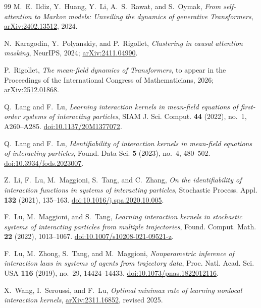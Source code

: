 \documentclass[11pt]{amsart}
\numberwithin{equation}{section}
\theoremstyle{plain}
\begin{document}
\begin{thebibliography}{99}
M.~E.~Ildiz, Y.~Huang, Y.~Li, A.~S.~Rawat, and S.~Oymak,
\emph{From self-attention to Markov models: Unveiling the dynamics of
generative Transformers},
\href{https://arxiv.org/abs/2402.13512}{arXiv:2402.13512}, 2024.

N.~Karagodin, Y.~Polyanskiy, and P.~Rigollet,
\emph{Clustering in causal attention masking},
NeurIPS, 2024;
\href{https://arxiv.org/abs/2411.04990}{arXiv:2411.04990}.

P.~Rigollet,
\emph{The mean-field dynamics of Transformers},
to appear in the Proceedings of the International Congress of Mathematicians,
2026;
\href{https://arxiv.org/abs/2512.01868}{arXiv:2512.01868}.

Q.~Lang and F.~Lu,
\emph{Learning interaction kernels in mean-field equations of first-order
systems of interacting particles},
SIAM J. Sci. Comput. \textbf{44} (2022), no.~1, A260--A285.
\href{https://doi.org/10.1137/20M1377072}{doi:10.1137/20M1377072}.

Q.~Lang and F.~Lu,
\emph{Identifiability of interaction kernels in mean-field equations of
interacting particles},
Found. Data Sci. \textbf{5} (2023), no.~4, 480--502.
\href{https://doi.org/10.3934/fods.2023007}{doi:10.3934/fods.2023007}.

Z.~Li, F.~Lu, M.~Maggioni, S.~Tang, and C.~Zhang,
\emph{On the identifiability of interaction functions in systems of
interacting particles},
Stochastic Process. Appl. \textbf{132} (2021), 135--163.
\href{https://doi.org/10.1016/j.spa.2020.10.005}
{doi:10.1016/j.spa.2020.10.005}.

F.~Lu, M.~Maggioni, and S.~Tang,
\emph{Learning interaction kernels in stochastic systems of interacting
particles from multiple trajectories},
Found. Comput. Math. \textbf{22} (2022), 1013--1067.
\href{https://doi.org/10.1007/s10208-021-09521-z}
{doi:10.1007/s10208-021-09521-z}.

F.~Lu, M.~Zhong, S.~Tang, and M.~Maggioni,
\emph{Nonparametric inference of interaction laws in systems of agents from
trajectory data},
Proc. Natl. Acad. Sci. USA \textbf{116} (2019), no.~29, 14424--14433.
\href{https://doi.org/10.1073/pnas.1822012116}
{doi:10.1073/pnas.1822012116}.

X.~Wang, I.~Seroussi, and F.~Lu,
\emph{Optimal minimax rate of learning nonlocal interaction kernels},
\href{https://arxiv.org/abs/2311.16852}{arXiv:2311.16852}, revised 2025.


\end{thebibliography}
\end{document}
